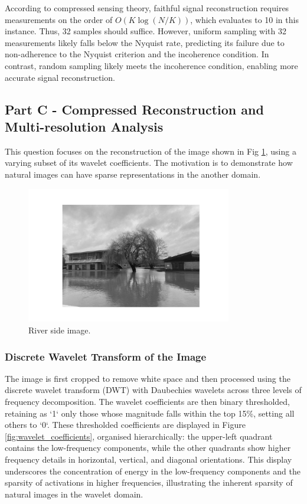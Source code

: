 \documentclass[11pt]{article}
\begin{document}
According to compressed sensing theory, faithful signal reconstruction requires measurements on the order of \(O(K \log(N/K))\), which evaluates to 10 in this instance. Thus, 32 samples should suffice. However, uniform sampling with 32 measurements likely falls below the Nyquist rate, predicting its failure due to non-adherence to the Nyquist criterion and the incoherence condition. In contrast, random sampling likely meets the incoherence condition, enabling more accurate signal reconstruction.



\subsection{Part C - Compressed Reconstruction and Multi-resolution Analysis}
This question focuses on the reconstruction of the image shown in Fig \ref{fig:river_side}, using a varying subset of its wavelet coefficients. The motivation is to demonstrate how natural images can have sparse representations in the another domain.
\begin{figure}[H]
    \centering
    \includegraphics[width=0.8\textwidth]{../data/river_side.jpeg}
    \caption{River side image.}
    \label{fig:river_side}
\end{figure}

\subsubsection{Discrete Wavelet Transform of the Image}
The image is first cropped to remove white space and then processed using the discrete wavelet transform (DWT) with Daubechies wavelets across three levels of frequency decomposition. The wavelet coefficients are then binary thresholded, retaining as `1` only those whose magnitude falls within the top 15\%, setting all others to `0`. These thresholded coefficients are displayed in Figure \ref{fig:wavelet_coefficients}, organised hierarchically: the upper-left quadrant contains the low-frequency components, while the other quadrants show higher frequency details in horizontal, vertical, and diagonal orientations. This display underscores the concentration of energy in the low-frequency components and the sparsity of activations in higher frequencies, illustrating the inherent sparsity of natural images in the wavelet domain.
\end{document}
